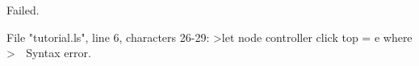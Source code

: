 \runverbatimfalse
{}
\begin{RunVerbatimMsg}
Failed.
\end{RunVerbatimMsg}
\begin{RunVerbatimErr}
File "tutorial.ls", line 6, characters 26-29:
>let node controller click top = e where
>                          ^^^
Syntax error.
\end{RunVerbatimErr}
